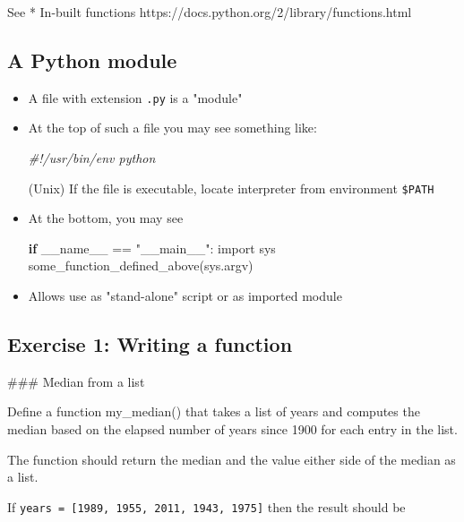 \documentclass[11pt]{article}
\newenvironment{Shaded}{}{}
\newcommand{\StringTok}[1]{\textcolor[rgb]{0.25,0.44,0.63}{{#1}}}
\newcommand{\CommentTok}[1]{\textcolor[rgb]{0.38,0.63,0.69}{\textit{{#1}}}}
\newcommand{\NormalTok}[1]{{#1}}
\newcommand{\ImportTok}[1]{{#1}}
\newcommand{\VariableTok}[1]{\textcolor[rgb]{0.10,0.09,0.49}{{#1}}}
\newcommand{\ControlFlowTok}[1]{\textcolor[rgb]{0.00,0.44,0.13}{\textbf{{#1}}}}
\newcommand{\OperatorTok}[1]{\textcolor[rgb]{0.40,0.40,0.40}{{#1}}}
\begin{document}
See * In-built functions
https://docs.python.org/2/library/functions.html

    \subsection{A Python module}\label{a-python-module}

\begin{itemize}
\item
  A file with extension \texttt{.py} is a "module"
\item
  At the top of such a file you may see something like:

\begin{Shaded}
\begin{Highlighting}[]
\CommentTok{#!/usr/bin/env python}
\end{Highlighting}
\end{Shaded}

  (Unix) If the file is executable, locate interpreter from environment
  \texttt{\$PATH}
\item
  At the bottom, you may see

\begin{Shaded}
\begin{Highlighting}[]
\ControlFlowTok{if} \VariableTok{__name__} \OperatorTok{==} \StringTok{"__main__"}\NormalTok{:}
\ImportTok{import} \NormalTok{sys}
\NormalTok{some_function_defined_above(sys.argv)}
\end{Highlighting}
\end{Shaded}
\item
  Allows use as "stand-alone" script or as imported module 
\end{itemize}

    \subsection{Exercise 1: Writing a
function}\label{exercise-1-writing-a-function}

 \#\#\# Median from a list

Define a function my\_median() that takes a list of years and computes
the median based on the elapsed number of years since 1900 for each
entry in the list.

The function should return the median and the value either side of the
median as a list.

If \texttt{years\ =\ {[}1989,\ 1955,\ 2011,\ 1943,\ 1975{]}} then the
result should be
\end{document}
